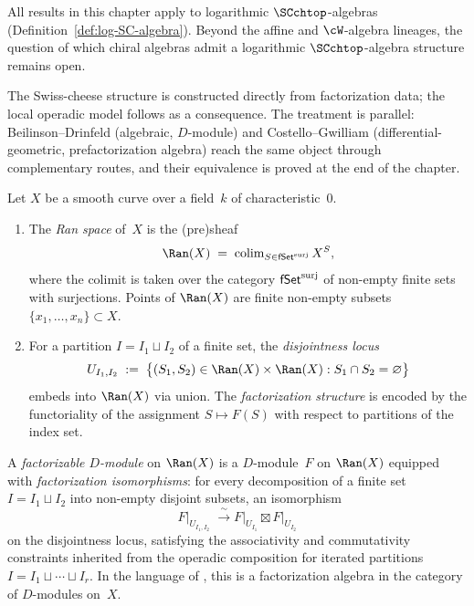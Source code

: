 All results in this chapter apply to logarithmic $\SCchtop$-algebras (Definition~\ref{def:log-SC-algebra}). Beyond the affine and $\cW$-algebra lineages, the question of which chiral algebras admit a logarithmic $\SCchtop$-algebra structure remains open.

The Swiss-cheese structure is constructed directly from
factorization data; the local operadic model follows as a
consequence. The treatment is parallel: Beilinson--Drinfeld
(algebraic, $D$-module) and Costello--Gwilliam (differential-geometric,
prefactorization algebra) reach the same object through complementary
routes, and their equivalence is proved at the end of the chapter.

\begin{definition}
\label{def:ran-space}
Let $X$ be a smooth curve over a field~$k$ of characteristic~$0$.
\begin{enumerate}[label=\textup{(\roman*)}]
\item The \emph{Ran space} of~$X$ is the (pre)sheaf
\begin{equation}\label{eq:ran-colim}
 \Ran(X)
 \;=\;
 \colim_{S \in \fSet^{\mathrm{surj}}} X^S,
\end{equation}
where the colimit is taken over the category $\mathsf{fSet}^{\mathrm{surj}}$ of
non-empty finite sets with surjections. Points of $\Ran(X)$ are finite
non-empty subsets $\{x_1,\ldots,x_n\} \subset X$.

\item For a partition $I = I_1 \sqcup I_2$ of a finite set, the
\emph{disjointness locus}
\[
 U_{I_1,I_2}
 \;:=\;
 \bigl\{(S_1,S_2) \in \Ran(X) \times \Ran(X) :
 S_1 \cap S_2 = \varnothing\bigr\}
\]
embeds into $\Ran(X)$ via union. The \emph{factorization structure} is
encoded by the functoriality of the assignment $S \mapsto F(S)$ with
respect to partitions of the index set.
\end{enumerate}
\end{definition}

\begin{definition}
\label{def:factorizable-dmod}
A \emph{factorizable $D$-module} on $\Ran(X)$ is a $D$-module~$F$
on $\Ran(X)$ equipped with \emph{factorization isomorphisms}: for
every decomposition of a finite set $I = I_1 \sqcup I_2$ into
non-empty disjoint subsets, an isomorphism
\begin{equation}\label{eq:fact-iso}
 F\big|_{U_{I_1,I_2}}
 \;\xrightarrow{\;\sim\;}
 F\big|_{U_{I_1}} \boxtimes F\big|_{U_{I_2}}
\end{equation}
on the disjointness locus, satisfying the associativity and
commutativity constraints inherited from the operadic composition for iterated partitions
$I = I_1 \sqcup \cdots \sqcup I_r$. In the language of
\cite{BD04}, this is a factorization algebra in the category of
$D$-modules on~$X$.
\end{definition}

